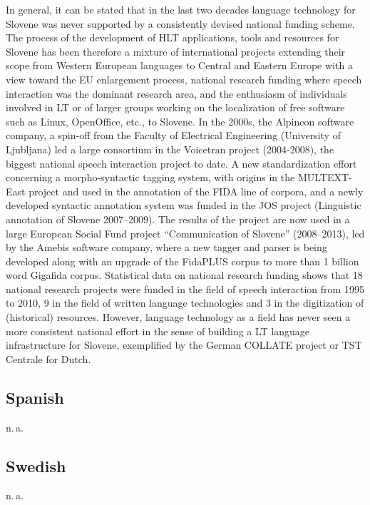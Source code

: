 \documentclass[10pt, plain]{../../metanetpaper}
\begin{document}
\begin{multicols}{2}
\begin{small}
In general, it can be stated that in the last two decades language technology for Slovene was never supported by a consistently devised national funding scheme. The process of the development of HLT applications, tools and resources for Slovene has been therefore a mixture of international projects extending their scope from Western European languages to Central and Eastern Europe with a view toward the EU enlargement process, national research funding where speech interaction was the dominant research area, and the enthusiasm of individuals involved in LT or of larger groups working on the localization of free software such as Linux, OpenOffice, etc., to Slovene.  In the 2000s, the Alpineon software company, a spin-off from the Faculty of Electrical Engineering (University of Ljubljana) led a large consortium in the Voicetran project (2004-2008), the biggest national speech interaction project to date.  A new standardization effort concerning a morpho-syntactic tagging system, with origins in the MULTEXT-East project and used in the annotation of the FIDA line of corpora, and a newly developed syntactic annotation system was funded in the JOS project (Linguistic annotation of Slovene 2007--2009). The results of the project are now used in a large European Social Fund project “Communication of Slovene” (2008--2013), led by the Amebis software company, where a new tagger and parser is being developed along with an upgrade of the FidaPLUS corpus to more than 1 billion word Gigafida corpus.  Statistical data on national research funding shows that 18 national research projects were funded in the field of speech interaction from 1995 to 2010, 9 in the field of written language technologies and 3 in the digitization of (historical) resources. However, language technology as a field has never seen a more consistent national effort in the sense of building a LT language infrastructure for Slovene, exemplified by the German COLLATE project or TST Centrale for Dutch.

\subsection*{Spanish}
\label{sec:spanish}

n.\,a.

\subsection*{Swedish}
\label{sec:swedish}

n.\,a.
\end{small}

\end{multicols}


\makespine
\end{document}
